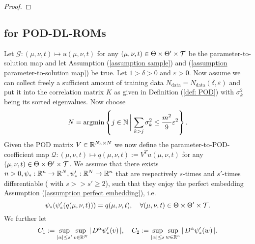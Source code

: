 \begin{proof}

\end{proof}


\subsection{for POD-DL-ROMs}


\begin{theorem} \label{theo: PAC bound for POD-DL-ROM}
    Let $\mathcal{G}: (\mu, \nu, t) \mapsto u(\mu, \nu, t)$ for any $(\mu, \nu, t) \in \Theta \times \Theta' \times \mathcal{T}$ be the
    parameter-to-solution map and let Assumption (\ref{assumption sample}) and (\ref{assumption parameter-to-solution map}) be true. Let $1  > \delta > 0$ and $\varepsilon > 0$.
    Now assume we can collect freely a sufficient amount of training data $N_{\text{data}} = N_{\text{data}}(\delta, \varepsilon)$ and put it into the
    correlation matrix $K$ as given in Definition (\ref{def: POD}) with $\sigma_k^2$ being its sorted eigenvalues. Now choose
    \begin{equation*}
        N = \operatorname{argmin} \left\{ j \in \mathbb{N} \, \bigg\vert \, \sum_{k > j} \sigma^2_k \leq \frac{m^2}{9} \varepsilon^2 \right\}.
    \end{equation*}
    Given the POD matrix $V \in \mathbb{R}^{N_h \times N}$ we now define the parameter-to-POD-coefficient map 
    $\mathcal{Q}: (\mu, \nu, t) \mapsto q(\mu, \nu, t) :=  V^T u(\mu, \nu, t)$ for 
    any $(\mu, \nu, t) \in \Theta \times \Theta' \times \mathcal{T}$. We assume that there exists $n > 0, \psi_* : \mathbb{R}^n \to \mathbb{R}^N, \psi_*' : \mathbb{R}^N \to \mathbb{R}^n$ that are respectively $s$-times and
    $s'$-times differentiable ( with $s >> s' \geq 2$), such that they enjoy the perfect embedding Assumption (\ref{assumption perfect embedding}), i.e. 
    \begin{equation*}
        \psi_*(\psi_*'(q(\mu, \nu, t))) = q(\mu, \nu, t), \quad \forall (\mu, \nu, t) \in \Theta \times \Theta' \times \mathcal{T}.
    \end{equation*}
    We further let 
    \begin{equation*}
        C_1 := \sup\limits_{\vert \alpha \vert \leq s'} \sup\limits_{v \in \R^N} \vert \, D^\alpha \psi_*'(v) \, \vert, \quad 
        C_2 := \sup\limits_{\vert \alpha \vert \leq s} \sup\limits_{w \in \R^n} \vert \, D^\alpha \psi_*'(w) \, \vert.

\end{equation*}
\end{theorem}
